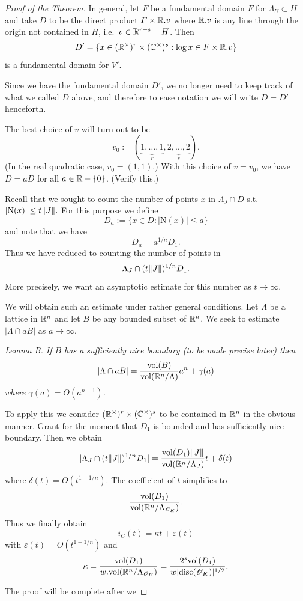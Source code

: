 \documentclass[10pt,a4paper,reqno]{amsart}
\begin{document}
\begin{proof}[Proof of the Theorem]
In general, let $F$ be a fundamental domain $F$ for $\Lambda_U \subset H$ and
take $D$ to be the direct product $F\times \mathbb{R}.v$ where $\mathbb{R}.v$ is any line
through the origin not contained in $H$, i.e.~$v\in \mathbb{R}^{r+s}-H$. Then $$D' =
\{x \in (\mathbb{R}^\times)^r\times (\mathbb{C}^\times)^s : \log x \in F \times \mathbb{R}.v\}$$ is a
fundamental domain for $V'$.

Since we have the fundamental domain $D'$, we no longer need to keep track of
what we called $D$ above, and therefore to ease notation we will write $D = D'$
henceforth.

The best choice of $v$ will turn out to be \[v_0 :=
(\underbrace{1,\dots,1}_{r},\underbrace{2,\dots,2}_{s}).\] (In the real
quadratic case, $v_0 = (1,1)$.) With this choice of $v=v_0$, we have $D=aD$ for
all $a\in \mathbb{R}-\{0\}$. (Verify this.)

Recall that we sought to count the number of points $x$ in $\Lambda_J\cap D$
s.t.~$|\mathrm{N}(x)| \le t\| J\|.$ For this purpose we define \[D_a :=
\{x\in D: |\mathrm{N}(x)| \le a\}\] and note that we have \[D_a = a^{1/n}
D_1.\] Thus we have reduced to counting the number of points in \[\Lambda_J\cap
(t\| J\|)^{1/n}D_1.\] More precisely, we want an asymptotic estimate for this
number as $t\rightarrow \infty.$

We will obtain such an estimate under rather general conditions. Let $\Lambda$
be a lattice in $\mathbb{R}^n$ and let $B$ be any bounded subset of $\mathbb{R}^n$. We seek to
estimate $|\Lambda\cap aB|$ as $a\rightarrow \infty.$

\bigskip

\emph{Lemma B. If $B$ has a sufficiently nice boundary (to be made precise
later) then \[|\Lambda\cap aB| = \frac{\mathrm{vol}(B)}{\mathrm{vol}(\mathbb{R}^n/\Lambda)}a^n +
\gamma(a)\] where $\gamma(a) = O(a^{n-1})$.}

\bigskip

To apply this we consider $(\mathbb{R}^\times)^r\times (\mathbb{C}^\times)^s$ to be contained
in $\mathbb{R}^n$ in the obvious manner. Grant for the moment that $D_1$ is bounded and
has sufficiently nice boundary. Then we obtain \[|\Lambda_J \cap
(t\| J\|)^{1/n}D_1 | = \frac{\mathrm{vol}(D_1)\| J\|}{\mathrm{vol}(\mathbb{R}^n/\Lambda_J)}t +
\delta(t)\] where $\delta(t) = O(t^{1-1/n}).$ The coefficient of $t$ simplifies
to \[\frac{\mathrm{vol}(D_1)}{\mathrm{vol}(\mathbb{R}^n/\Lambda_{\mathscr{O}_K})}.\] Thus we finally obtain
\[i_C(t) = \kappa t + \varepsilon(t)\] with $\varepsilon(t) = O(t^{1-1/n})$ and
\[\kappa = \frac{\mathrm{vol}(D_1)}{w.\mathrm{vol}(\mathbb{R}^n/\Lambda_{\mathscr{O}_K})} = \frac{2^s \mathrm{vol}(D_1)}{
w|\mathrm{disc}(\mathscr{O}_K)|^{1/2}}.\]

The proof will be complete after we


\end{proof}
\end{document}
